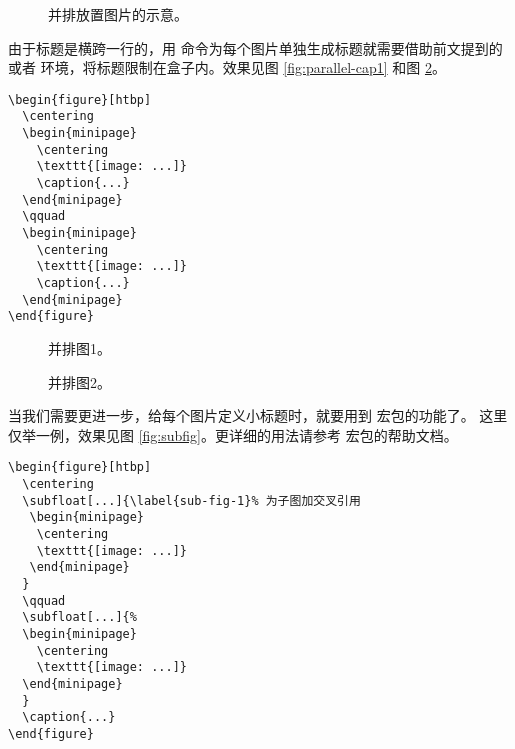 \begin{figure}[htb]
  \centering
  \qquad
  \par\bigskip
  \caption{并排放置图片的示意。}\label{fig:parallel-fig}
\end{figure}

由于标题是横跨一行的，用  命令为每个图片单独生成标题就需要借助前文提到的 
或者  环境，将标题限制在盒子内。效果见图 \ref{fig:parallel-cap1} 和图 \ref{fig:parallel-cap2}。
\begin{verbatim}
\begin{figure}[htbp]
  \centering
  \begin{minipage}
    \centering
    \texttt{[image: ...]}
    \caption{...}
  \end{minipage}
  \qquad
  \begin{minipage}
    \centering
    \texttt{[image: ...]}
    \caption{...}
  \end{minipage}  
\end{figure}
\end{verbatim}

\begin{figure}[htb]
  \centering
  \begin{minipage}{12em}
    \centering
    \caption{并排图1。}\label{fig:parallel-cap1}
  \end{minipage}
  \qquad
  \begin{minipage}{12em}
    \centering
    \caption{并排图2。}\label{fig:parallel-cap2}
  \end{minipage}
\end{figure}

当我们需要更进一步，给每个图片定义小标题时，就要用到  宏包的功能了。
这里仅举一例，效果见图 \ref{fig:subfig}。更详细的用法请参考  宏包的帮助文档。
\begin{verbatim}
\begin{figure}[htbp]
  \centering
  \subfloat[...]{\label{sub-fig-1}% 为子图加交叉引用
   \begin{minipage}
    \centering
    \texttt{[image: ...]}
   \end{minipage}
  }
  \qquad
  \subfloat[...]{%
  \begin{minipage}
    \centering
    \texttt{[image: ...]}
  \end{minipage}
  }
  \caption{...}
\end{figure}
\end{verbatim}

